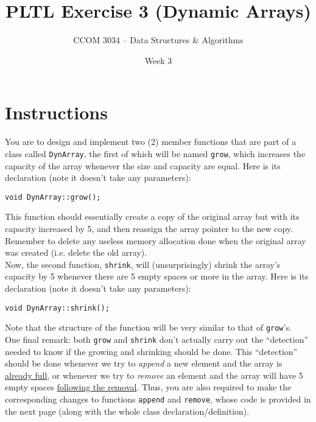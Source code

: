 \documentclass[11 pt]{article}
\title{PLTL Exercise 3 (Dynamic Arrays)}
\author{CCOM 3034 – Data Structures \& Algorithms}
\date{Week 3}
\begin{document}
\maketitle

\section{Instructions}

You are to design and implement two (2) member functions that are part of a class called \texttt{DynArray}, the first of which will be named \texttt{grow}, which increases the capacity of the array whenever the size and capacity are equal. Here is its declaration (note it doesn't take any parameters):

\begin{center}
    \texttt{void DynArray::grow();}
\end{center}

\noindent This function should essentially create a copy of the original array but with its capacity increased by 5, and then reassign the array pointer to the new copy. Remember to delete any useless memory allocation done when the original array was created (i.e. delete the old array). \\

\noindent Now, the second function, \texttt{shrink}, will (unsurprisingly) shrink the array's capacity by 5 whenever there are 5 empty spaces or more in the array. Here is its declaration (note it doesn't take any parameters):

\begin{center}
    \texttt{void DynArray::shrink();}
\end{center}

\noindent Note that the structure of the function will be very similar to that of \texttt{grow}'s. \\

\noindent One final remark: both \texttt{grow} and \texttt{shrink} don't actually carry out the ``detection'' needed to know if the growing and shrinking should be done. This ``detection'' should be done whenever we try to \textit{append} a new element and the array is \underline{already full}, or whenever we try to \textit{remove} an element and the array will have 5 empty spaces \underline{following the removal}. Thus, you are also required to make the corresponding changes to functions \texttt{append} and \texttt{remove}, whose code is provided in the next page (along with the whole class declaration/definition).
\end{document}
